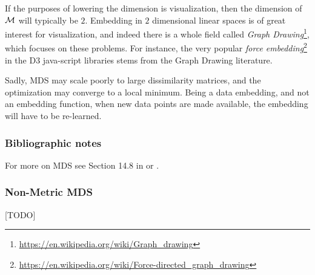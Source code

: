 \documentclass[12pt,a4paper]{article}
\begin{document}
\begin{remark}
	If the purposes of lowering the dimension is visualization, then the dimension of $\mathcal{M}$ will typically be $2$. 
	Embedding in $2$ dimensional linear spaces is of great interest for visualization, and indeed there is a whole field called \emph{Graph Drawing}\footnote{\url{https://en.wikipedia.org/wiki/Graph_drawing}}, which focuses on these problems.
	For instance, the very popular \emph{force embedding}\footnote{\url{https://en.wikipedia.org/wiki/Force-directed_graph_drawing}} in the D3 java-script libraries stems from the Graph Drawing literature. 
\end{remark}


Sadly, MDS may scale poorly to large dissimilarity matrices, and the optimization may converge to a local minimum.
Being a data embedding, and not an embedding function, when new data points are made available, the embedding will have to be re-learned.

\subsubsection{Bibliographic notes}
For more on MDS see Section 14.8 in \cite{friedman2001elements} or \cite{borg_modern_2005}.



\subsubsection{Non-Metric MDS}
[TODO]
\end{document}
